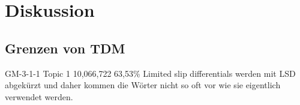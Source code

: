 \chapter{Diskussion}

\section{Grenzen von TDM}
GM-3-1-1
Topic 1 
10,066,722	63,53\%
Limited slip differentials werden mit LSD abgekürzt und daher kommen die Wörter nicht so oft vor wie sie eigentlich verwendet werden.